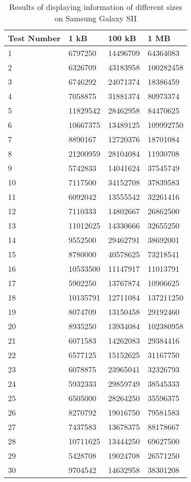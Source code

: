 	\begin{table}[ht!]
    		\caption{Results of displaying information of different sizes on Samsung Galaxy SII} \label{tab:distamceGoogleGlassFull}
		\centering \begin{tabularx}{\textwidth}{l|X|X|X} \hline
		Test Number & \textbf{1 kB} & \textbf{100 kB} & \textbf{1 MB} \\ \hline \hline
       
		1&	6797250	&	14496709	&	64364083		\\ \hline
		2&	6326709	&	43183958	&	100282458	\\ \hline
		3&	6746292	&	24071374	&	18386459		\\ \hline
		4&	7058875	&	31881374	&	80973374		\\ \hline
		5&	11829542	&	28462958	&	84470625		\\ \hline
		6&	10667375	&	13489125	&	109992750	\\ \hline
		7&	8890167	&	12720376	&	18701084		\\ \hline
		8&	21200959	&	28104084	&	11930708		\\ \hline
		9&	5742833	&	14041624	&	37545749		\\ \hline
		10&	7117500	&	34152708	&	37839583		\\ \hline
		11&	6092042	&	13555542	&	32261416		\\ \hline
		12&	7110333	&	14802667	&	26862500		\\ \hline
		13&	11012625	&	14330666	&	32655250		\\ \hline
		14&	9552500	&	29462791	&	38692001		\\ \hline
		15&	8780000	&	40578625	&	73218541		\\ \hline
		16&	10533500	&	11147917	&	11013791		\\ \hline
		17&	5902250	&	13767874	&	10906625		\\ \hline
		18&	10135791	&	12711084	&	137211250	\\ \hline
		19&	8074709	&	13150458	&	29192460		\\ \hline
		20&	8935250	&	13934084	&	102380958	\\ \hline
		21&	6071583	&	14262083	&	29384416		\\ \hline
		22&	6577125	&	15152625	&	31167750		\\ \hline
		23&	6078875	&	23965041	&	32326793		\\ \hline
		24&	5932333	&	29859749	&	38545333		\\ \hline
		25&	6505000	&	28264250	&	35596375		\\ \hline
		26&	8270792	&	19016750	&	79581583		\\ \hline
		27&	7437583	&	13678375	&	88178667		\\ \hline
		28&	10711625	&	13444250	&	69627500		\\ \hline
		29&	5428708	&	19024708	&	26571250		\\ \hline
		30&	9704542	&	14632958	&	38301208		\\ \hline

		\end{tabularx}
	\end{table}
	
